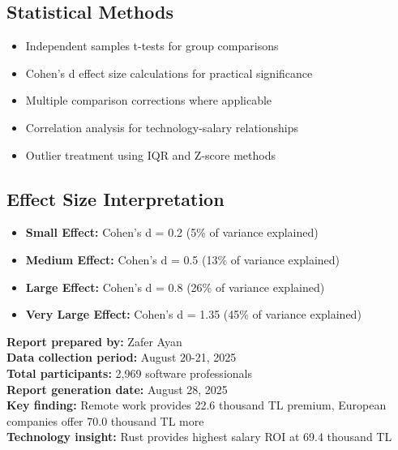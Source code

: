 \documentclass[12pt,a4paper]{article}
\begin{document}
\subsection{Statistical Methods}
\begin{itemize}
    \item Independent samples t-tests for group comparisons
    \item Cohen's d effect size calculations for practical significance
    \item Multiple comparison corrections where applicable
    \item Correlation analysis for technology-salary relationships
    \item Outlier treatment using IQR and Z-score methods
\end{itemize}

\subsection{Effect Size Interpretation}
\begin{itemize}
    \item \textbf{Small Effect:} Cohen's d = 0.2 (5\% of variance explained)
    \item \textbf{Medium Effect:} Cohen's d = 0.5 (13\% of variance explained)
    \item \textbf{Large Effect:} Cohen's d = 0.8 (26\% of variance explained)
    \item \textbf{Very Large Effect:} Cohen's d = 1.35 (45\% of variance explained)
\end{itemize}

\vspace{2cm}

\begin{center}
\textbf{Report prepared by:} Zafer Ayan\\
\textbf{Data collection period:} August 20-21, 2025\\
\textbf{Total participants:} 2,969 software professionals\\
\textbf{Report generation date:} August 28, 2025\\
\textbf{Key finding:} Remote work provides 22.6 thousand TL premium, European companies offer 70.0 thousand TL more\\
\textbf{Technology insight:} Rust provides highest salary ROI at 69.4 thousand TL
\end{center}
\end{document}
